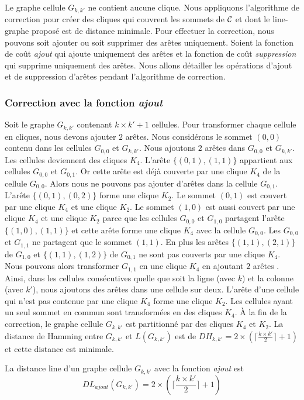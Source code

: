 Le graphe cellule $G_{k,k'}$ ne contient aucune clique. 
Nous appliquons l'algorithme de correction pour cr\'eer des cliques qui couvrent les sommets de ${\cal C}$ et dont le line-graphe propos\'e est de distance minimale.
Pour effectuer la correction, nous pouvons soit ajouter ou soit supprimer des ar\^etes uniquement.
Soient la fonction de co\^ut {\em ajout} qui ajoute uniquement des ar\^etes et la fonction de co\^ut {\em suppression} qui supprime uniquement des ar\^etes. 
Nous allons d\'etailler les op\'erations d'ajout et de suppression d'ar\^etes pendant l'algorithme de correction. 

\subsubsection{Correction avec la fonction {\em ajout}}
Soit le graphe $G_{k,k'}$ contenant $k \times k' + 1$ cellules.
Pour transformer chaque cellule en cliques, nous devons ajouter $2$ ar\^etes.
Nous consid\'erons le sommet $(0,0)$ contenu dans les cellules $G_{0,0}$ et $G_{k,k'}$.
Nous ajoutons $2$ ar\^etes dans $G_{0,0}$ et $G_{k,k'}$. Les cellules deviennent des cliques $K_4$. 
\newline
L'ar\^ete $\{(0,1),(1,1)\}$ appartient aux cellules  $G_{0,0}$ et  $G_{0,1}$. Or cette ar\^ete est d\'ej\`a couverte par une clique $K_4$ de la cellule $G_{0,0}$. Alors nous ne pouvons pas ajouter d'ar\^etes dans la cellule $G_{0,1}$. L'ar\^ete $\{(0,1),(0,2)\}$ forme une clique $K_2$. Le sommet $(0,1)$ est couvert par une clique $K_4$ et une clique $K_2$. 
Le sommet $(1,0)$ est aussi couvert par une clique $K_4$ et une clique $K_2$ parce que les cellules $G_{0,0}$ et  $G_{1,0}$ partagent l'ar\^ete $\{(1,0),(1,1)\}$  et cette ar\^ete forme une clique $K_4$ avec la cellule $G_{0,0}$.
Les $G_{0,0}$ et  $G_{1,1}$ ne partagent que le sommet  $(1,1)$. En plus les ar\^etes  $\{(1,1),(2,1)\}$ de  $G_{1,0}$ et  $\{(1,1),(1,2)\}$ de $G_{0,1}$ ne sont pas couverts par une clique $K_4$. Nous pouvons alors transformer $G_{1,1}$ en une clique $K_4$  en ajoutant $2$ ar\^etes .
\newline
Ainsi, dans les cellules cons\'ecutives quelle que soit la ligne (avec $k$) et la colonne (avec $k'$), nous ajoutons des ar\^etes dans une cellule sur deux. 
L'ar\^ete  d'une cellule qui n'est pas contenue par une clique $K_4$ forme une clique $K_2$.
Les cellules ayant un seul sommet en commun sont transform\'ees en des cliques $K_4$. 
\newline
\`A la fin  de la correction, le graphe cellule $G_{k,k'}$ est partitionn\'e par des cliques $K_4$ et $K_2$.
La distance de Hamming entre $G_{k,k'}$ et $L(G_{k,k'})$ est de $DH_{k,k'} = 2 \times (\lceil \frac{k \times k'}{2} \rceil  + 1)$ et cette distance est minimale.
\begin{theorem}
La distance line d'un graphe cellule $G_{k,k'}$ avec la fonction {\em ajout} est 
\begin{equation}
DL_{ajout}(G_{k,k'}) = 2 \times (\lceil \frac{k \times k'}{2} \rceil  + 1)
\end{equation}
\end{theorem}

